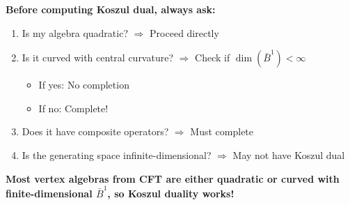 \begin{remark}\label{rem:practitioner-takeaway}
\textbf{Before computing Koszul dual, always ask:}
\begin{enumerate}
\item Is my algebra quadratic? $\Rightarrow$ Proceed directly
\item Is it curved with central curvature? $\Rightarrow$ Check if $\dim(\bar{B}^1) < \infty$
  \begin{itemize}
  \item If yes: No completion
  \item If no: Complete!
  \end{itemize}
\item Does it have composite operators? $\Rightarrow$ Must complete
\item Is the generating space infinite-dimensional? $\Rightarrow$ May not have Koszul dual
\end{enumerate}

\textbf{Most vertex algebras from CFT are either quadratic or curved with finite-dimensional 
$\bar{B}^1$, so Koszul duality works!}
\end{remark}

